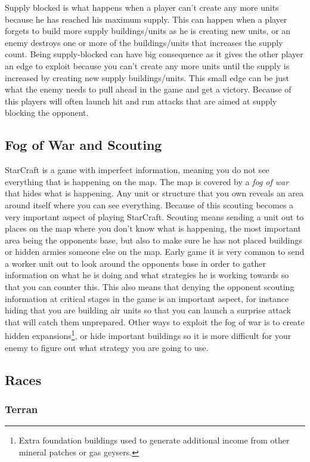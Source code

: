 Supply blocked is what happens when a player can't create any more units because
he has reached his maximum supply. This can happen when a player forgets to
build more supply buildings/units as he is creating new units, or an enemy
destroys one or more of the buildings/units that increases the supply count.
Being supply-blocked can have big consequence as it gives the other player an
edge to exploit because you can't create any more units until the supply is
increased by creating new supply buildings/units. This small edge can be just
what the enemy needs to pull ahead in the game and get a victory. Because of
this players will often launch hit and run attacks that are aimed at supply
blocking the opponent.
 
\subsection{Fog of War and Scouting}
StarCraft is a game with imperfect information, meaning you do not see
everything that is happening on the map. The map is covered by a \textit{fog
of war} that hides what is happening. Any unit or structure that you own reveals
an area around itself where you can see everything. Because of this scouting
becomes a very important aspect of playing StarCraft. Scouting means sending a
unit out to places on the map where you don't know what is happening, the most
important area being the opponents base, but also to make sure he has not placed
buildings or hidden armies someone else on the map. Early game it is very common
to send a worker unit out to look around the opponents base in order to gather
information on what he is doing and what strategies he is working towards so
that you can counter this. This also means that denying the opponent scouting
information at critical stages in the game is an important aspect, for instance
hiding that you are building air units so that you can launch a surprise attack
that will catch them unprepared. Other ways to exploit the fog of war is to
create hidden expansions\footnote{Extra foundation buildings used to generate
additional income from other mineral patches or gas geysers.}, or hide important
buildings so it is more difficult for your enemy to figure out what strategy you
are going to use. 

\subsection{Races}

\subsubsection{Terran}

